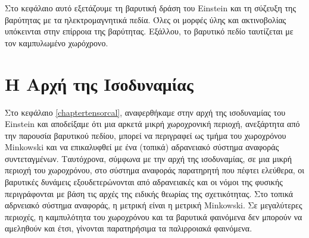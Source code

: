 Στο κεφάλαιο αυτό εξετάζουμε τη βαρυτική δράση του Einstein και τη σύζευξη της βαρύτητας με τα ηλεκτρομαγνητικά πεδία. 
Όλες οι μορφές ύλης και ακτινοβολίας υπόκεινται στην επίρροια της βαρύτητας. Εξάλλου, το βαρυτικό πεδίο ταυτίζεται με τον καμπυλωμένο χωρόχρονο.

\section{Η Αρχή της Ισοδυναμίας}
Στο κεφάλαιο \ref{chaptertensorcal}, αναφερθήκαμε στην αρχή της ισοδυναμίας του Einstein και αποδείξαμε ότι μια αρκετά μικρή χωροχρονική περιοχή, ανεξάρτητα από την παρουσία βαρυτικού πεδίου, μπορεί να περιγραφεί ως τμήμα του χωροχρόνου Minkowski και να επικαλυφθεί με ένα (τοπικά) αδρανειακό σύστημα αναφοράς συντεταγμένων. Ταυτόχρονα, σύμφωνα με την αρχή της ισοδυναμίας, σε μια μικρή περιοχή του χωροχρόνου, στο σύστημα αναφοράς παρατηρητή που πέφτει ελεύθερα, οι βαρυτικές δυνάμεις εξουδετερώνονται από αδρανειακές και οι νόμοι της φυσικής περιγράφονται με βάση τις αρχές της ειδικής θεωρίας της σχετικότητας. Στο τοπικά αδρνειακό σύστημα αναφοράς, η μετρική είναι η μετρική Minkowski. 
Σε μεγαλύτερες περιοχές, η καμπυλότητα του χωροχρόνου και τα βαρυτικά φαινόμενα δεν μπορούν να αμεληθούν και 
έτσι, γίνονται παρατηρήσιμα τα παλιρροιακά φαινόμενα. 

